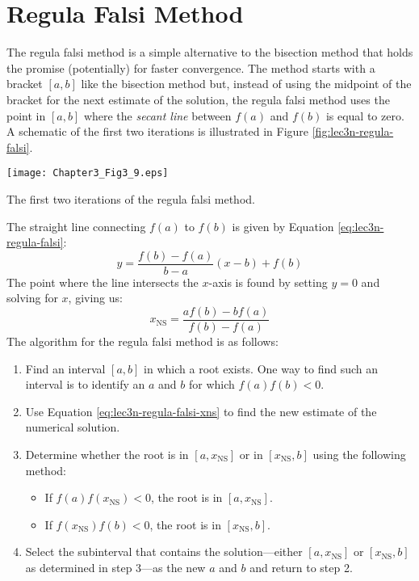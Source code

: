 \section{Regula Falsi Method}
The regula falsi method is a simple alternative to the bisection method that holds the promise (potentially) for faster convergence.  The method starts with a bracket $[a,b]$ like the bisection method but, instead of using the midpoint of the bracket for the next estimate of the solution, the regula falsi method uses the point in $[a,b]$ where the \emph{secant line} between $f(a)$ and $f(b)$ is equal to zero.  A schematic of the first two iterations is illustrated in Figure \ref{fig:lec3n-regula-falsi}.
\begin{marginfigure}
\texttt{[image: Chapter3\_Fig3\_9.eps]}
\caption{The first two iterations of the regula falsi method.}
\label{fig:lec3n-regula-falsi}
\end{marginfigure}
The straight line connecting $f(a)$ to $f(b)$ is given by Equation \ref{eq:lec3n-regula-falsi}:
\begin{equation}
y = \frac{f(b) - f(a)}{b-a}(x-b)+f(b)
\label{eq:lec3n-regula-falsi}
\end{equation}
The point where the line intersects the $x$-axis is found by setting $y=0$ and solving for $x$, giving us:
\begin{equation}
x_{\text{NS}} = \frac{a f(b) - b f(a)}{f(b) - f(a)}
\label{eq:lec3n-regula-falsi-xns}
\end{equation}
The algorithm for the regula falsi method is as follows:
\begin{enumerate}
\item Find an interval $[a,b]$ in which a root exists.  One way to find such an interval is to identify an $a$ and $b$ for which $f(a)f(b)<0$.
\item Use Equation \ref{eq:lec3n-regula-falsi-xns} to find the new estimate of the numerical solution.
\item Determine whether the root is in $[a,x_{\text{NS}}]$ or in $[x_{\text{NS}},b]$ using the following method:
\begin{itemize}
\item If $f(a)f(x_{\text{NS}}) < 0$, the root is in $[a,x_{\text{NS}}]$.
\item If $f(x_{\text{NS}})f(b) < 0$, the root is in $[x_{\text{NS}},b]$.
\end{itemize}
\item Select the subinterval that contains the solution---either $[a,x_{\text{NS}}]$ or $[x_{\text{NS}},b]$ as determined in step 3---as the new $a$ and $b$ and return to step 2.
\end{enumerate}
